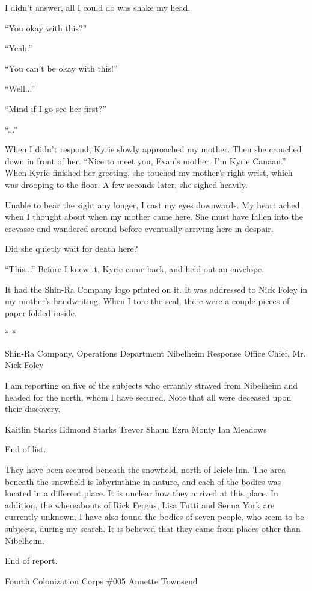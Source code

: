 \documentclass[oneside]{book}
\begin{document}
I didn’t answer, all I could do was shake my head.

“You okay with this?”

“Yeah.”

“You can’t be okay with this!”

“Well...”

“Mind if I go see her first?”

“...”

When I didn’t respond, Kyrie slowly approached my mother. Then she crouched down in front of her. “Nice to meet you, Evan’s mother. I’m Kyrie Canaan.” When Kyrie finished her greeting, she touched my mother’s right wrist, which was drooping to the floor. A few seconds later, she sighed heavily.

Unable to bear the sight any longer, I cast my eyes downwards. My heart ached when I thought about when my mother came here. She must have fallen into the crevasse and wandered around before eventually arriving here in despair.

Did she quietly wait for death here?

“This...” Before I knew it, Kyrie came back, and held out an envelope.

It had the Shin-Ra Company logo printed on it. It was addressed to Nick Foley in my mother’s handwriting. When I tore the seal, there were a couple pieces of paper folded inside.

* *

Shin-Ra Company, Operations Department Nibelheim Response Office Chief, Mr. Nick Foley

I am reporting on five of the subjects who errantly strayed from Nibelheim and headed for the north, whom I have secured. Note that all were deceased upon their discovery.

Kaitlin Starks
Edmond Starks
Trevor Shaun
Ezra Monty
Ian Meadows

End of list.

They have been secured beneath the snowfield, north of Icicle Inn. The area beneath the snowfield is labyrinthine in nature, and each of the bodies was located in a different place. It is unclear how they arrived at this place. In addition, the whereabouts of Rick Fergus, Lisa Tutti and Senna York are currently unknown. I have also found the bodies of seven people, who seem to be subjects, during my search. It is believed that they came from places other than Nibelheim.

End of report.

Fourth Colonization Corps \#005 Annette Townsend
\end{document}
